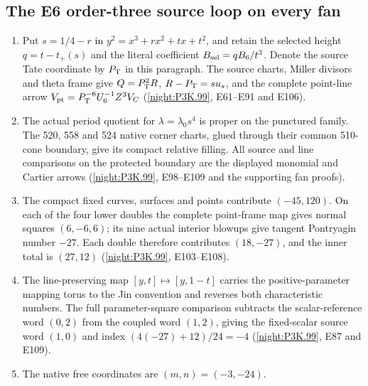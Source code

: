 \subsection{The E6 order-three source loop on every fan}
\RungOne
\begin{enumerate}[label=\arabic*.]
\item Put $s=1/4-r$ in
  $y^2=x^3+rx^2+tx+t^2$, and retain the selected height
  $q=t-t_+(s)$ and the literal coefficient $B_{\rm sel}=qB_6/t^3$.
  Denote the source Tate coordinate by $P_{\rm T}$ in this
  paragraph. The source charts, Miller divisors and theta frame give
  $Q=P_{\rm T}^2R$, $R-P_{\rm T}=s u_s$, and the complete point-line arrow
  $V_{\rm pt}=P_{\rm T}^{-6}U_6^{-1}Z^3V_C$
  (\cref{night:P3K.99}, E61--E91 and E106).
\item The actual period quotient for $\lambda=\lambda_0s^4$
  is proper on the punctured family. The 520, 558 and 524 native
  corner charts, glued through their common 510-cone boundary,
  give its compact relative filling. All source and line
  comparisons on the protected boundary are the displayed
  monomial and Cartier arrows
  (\cref{night:P3K.99}, E98--E109 and the supporting fan proofs).
\item The compact fixed curves, surfaces and points contribute
  $(-45,120)$. On each of the four lower doubles the complete
  point-frame map gives normal squares $(6,-6,6)$; its nine actual
  interior blowups give tangent Pontryagin number $-27$.
  Each double therefore contributes $(18,-27)$, and the inner
  total is $(27,12)$ (\cref{night:P3K.99}, E103--E108).
\item The line-preserving map $[y,t]\mapsto[y,1-t]$ carries the
  positive-parameter mapping torus to the Jin convention and
  reverses both characteristic numbers. The full parameter-square
  comparison subtracts the scalar-reference word $(0,2)$ from
  the coupled word $(1,2)$, giving the fixed-scalar source word
  $(1,0)$ and index $(4(-27)+12)/24=-4$
  (\cref{night:P3K.99}, E87 and E109).
\item The native free coordinates are $(m,n)=(-3,-24)$.

\end{enumerate}
